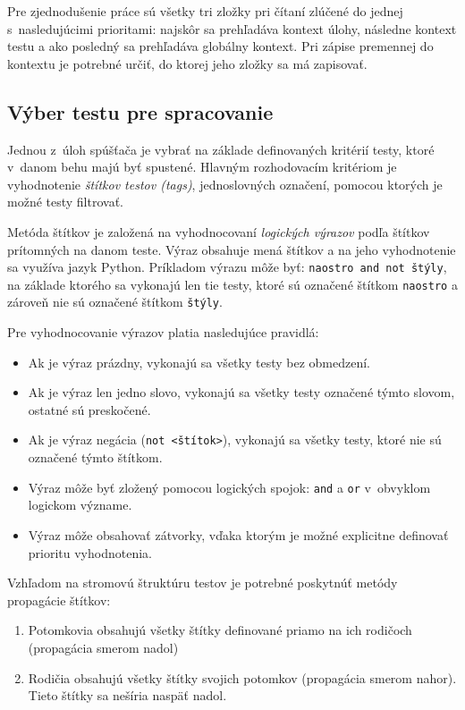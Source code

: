 \documentclass[
  digital, %
  oneside, %
  table,   %
  lof,     %
  lot,   %
]{fithesis3}
\begin{document}
Pre zjednodušenie práce sú všetky tri zložky pri čítaní zlúčené do jednej s~nasledujúcimi prioritami: najskôr sa prehľadáva kontext úlohy, následne kontext testu a ako posledný sa prehľadáva globálny kontext. Pri zápise premennej do kontextu je potrebné určiť, do ktorej jeho zložky sa má zapisovať. 

\subsection{Výber testu pre spracovanie}

Jednou z~úloh spúšťača je vybrať na základe definovaných kritérií testy, ktoré v~danom behu majú byť spustené. Hlavným rozhodovacím kritériom je vyhodnotenie \emph{štítkov testov (tags)}, jednoslovných označení, pomocou ktorých je možné testy filtrovať.

Metóda štítkov je založená na vyhodnocovaní \emph{logických výrazov} podľa štítkov prítomných na danom teste. Výraz obsahuje mená štítkov a na jeho vyhodnotenie sa využíva jazyk Python. Príkladom výrazu môže byť: \texttt{naostro and not štýly}, na základe ktorého sa vykonajú len tie testy, ktoré sú označené štítkom \texttt{naostro} a zároveň nie sú označené štítkom \texttt{štýly}. 

Pre vyhodnocovanie výrazov platia nasledujúce pravidlá:
\begin{itemize}
    \item Ak je výraz prázdny, vykonajú sa všetky testy bez obmedzení.
    \item Ak je výraz len jedno slovo, vykonajú sa všetky testy označené týmto slovom, ostatné sú preskočené.
    \item Ak je výraz negácia (\texttt{not <štítok>}), vykonajú sa všetky testy, ktoré nie sú označené týmto štítkom.
    \item Výraz môže byť zložený pomocou logických spojok: \texttt{and} a \texttt{or} v~obvyklom logickom význame.
    \item Výraz môže obsahovať zátvorky, vďaka ktorým je možné explicitne definovať prioritu vyhodnotenia. 
\end{itemize}

Vzhľadom na stromovú štruktúru testov je potrebné poskytnúť metódy propagácie štítkov:
\begin{enumerate}
    \item Potomkovia obsahujú všetky štítky definované priamo na ich rodičoch (propagácia smerom nadol)
    \item Rodičia obsahujú všetky štítky svojich potomkov (propagácia smerom nahor). Tieto štítky sa nešíria naspäť nadol.
\end{enumerate}
\end{document}

